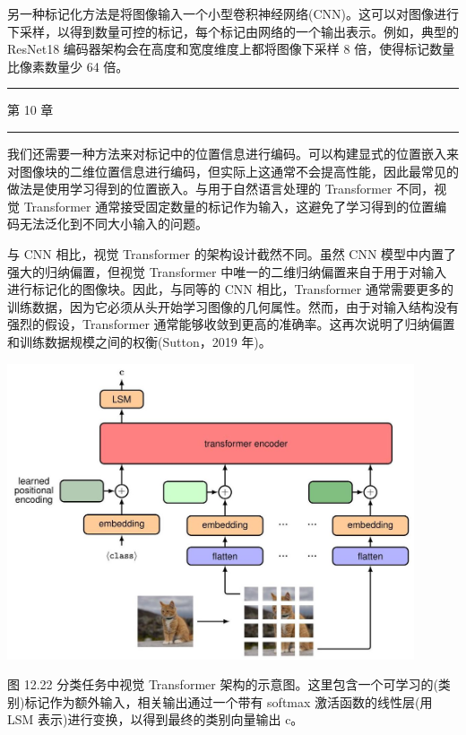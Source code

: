 \documentclass[10pt]{article}
\newcommand{\HRule}{\begin{center}\rule{0.9\linewidth}{0.2mm}\end{center}}
\begin{document}
另一种标记化方法是将图像输入一个小型卷积神经网络(CNN)。这可以对图像进行下采样，以得到数量可控的标记，每个标记由网络的一个输出表示。例如，典型的 ResNet18 编码器架构会在高度和宽度维度上都将图像下采样 8 倍，使得标记数量比像素数量少 64 倍。

\HRule

第 10 章

\HRule

我们还需要一种方法来对标记中的位置信息进行编码。可以构建显式的位置嵌入来对图像块的二维位置信息进行编码，但实际上这通常不会提高性能，因此最常见的做法是使用学习得到的位置嵌入。与用于自然语言处理的 Transformer 不同，视觉 Transformer 通常接受固定数量的标记作为输入，这避免了学习得到的位置编码无法泛化到不同大小输入的问题。

与 CNN 相比，视觉 Transformer 的架构设计截然不同。虽然 CNN 模型中内置了强大的归纳偏置，但视觉 Transformer 中唯一的二维归纳偏置来自于用于对输入进行标记化的图像块。因此，与同等的 CNN 相比，Transformer 通常需要更多的训练数据，因为它必须从头开始学习图像的几何属性。然而，由于对输入结构没有强烈的假设，Transformer 通常能够收敛到更高的准确率。这再次说明了归纳偏置和训练数据规模之间的权衡(Sutton，2019 年)。

\begin{center}
\includegraphics[max width=0.9\textwidth]{images/0194e279-9b28-703a-88f4-c3ac21e2010d_415_325_348_1193_868_0.jpg}
\end{center}
\hspace*{3em} 

图 12.22 分类任务中视觉 Transformer 架构的示意图。这里包含一个可学习的(类别)标记作为额外输入，相关输出通过一个带有 softmax 激活函数的线性层(用 LSM 表示)进行变换，以得到最终的类别向量输出 c。
\end{document}
